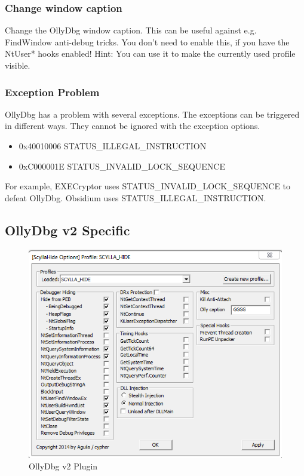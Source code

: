 \documentclass[10pt,a4paper]{article}
\begin{document}
\subsubsection{Change window caption}
Change the OllyDbg window caption. This can be useful against e.g. FindWindow anti-debug tricks. You don't need to enable this, if you have the NtUser* hooks enabled! Hint: You can use it to make the currently used profile visible.

\subsubsection{Exception Problem}
OllyDbg has a problem with several exceptions. The exceptions can be triggered in different ways. They cannot be ignored with the exception options.

\begin{itemize}
\item 0x40010006 STATUS\_ILLEGAL\_INSTRUCTION
\item 0xC000001E STATUS\_INVALID\_LOCK\_SEQUENCE
\end{itemize}

For example, EXECryptor uses STATUS\_INVALID\_LOCK\_SEQUENCE to defeat OllyDbg. Obsidium uses STATUS\_ILLEGAL\_INSTRUCTION.

\subsection{OllyDbg v2 Specific}

\begin{figure}[H]
\centering
\includegraphics[scale=1]{ollyv2plugin.PNG}
\caption{OllyDbg v2 Plugin}
\end{figure}
\end{document}
